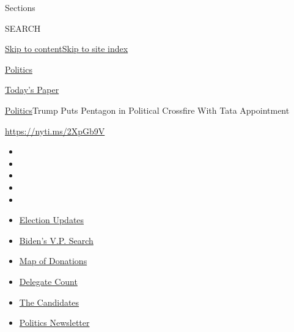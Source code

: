 Sections

SEARCH

\protect\hyperlink{site-content}{Skip to
content}\protect\hyperlink{site-index}{Skip to site index}

\href{https://www.nytimes3xbfgragh.onion/section/politics}{Politics}

\href{https://myaccount.nytimes3xbfgragh.onion/auth/login?response_type=cookie\&client_id=vi}{}

\href{https://www.nytimes3xbfgragh.onion/section/todayspaper}{Today's
Paper}

\href{/section/politics}{Politics}\textbar{}Trump Puts Pentagon in
Political Crossfire With Tata Appointment

\url{https://nyti.ms/2XpGb9V}

\begin{itemize}
\item
\item
\item
\item
\item
\end{itemize}

\begin{itemize}
\item
  \href{https://www.nytimes3xbfgragh.onion/2020/08/03/us/elections/biden-vs-trump.html?action=click\&pgtype=Article\&state=default\&region=TOP_BANNER\&context=storylines_menu}{Election
  Updates}
\item
  \href{https://www.nytimes3xbfgragh.onion/article/biden-vice-president-2020.html?action=click\&pgtype=Article\&state=default\&region=TOP_BANNER\&context=storylines_menu}{Biden's
  V.P. Search}
\item
  \href{https://www.nytimes3xbfgragh.onion/interactive/2020/07/24/us/politics/trump-biden-campaign-donors.html?action=click\&pgtype=Article\&state=default\&region=TOP_BANNER\&context=storylines_menu}{Map
  of Donations}
\item
  \href{https://www.nytimes3xbfgragh.onion/interactive/2020/us/elections/delegate-count-primary-results.html?action=click\&pgtype=Article\&state=default\&region=TOP_BANNER\&context=storylines_menu}{Delegate
  Count}
\item
  \href{https://www.nytimes3xbfgragh.onion/interactive/2019/us/politics/2020-presidential-candidates.html?action=click\&pgtype=Article\&state=default\&region=TOP_BANNER\&context=storylines_menu}{The
  Candidates}
\item
  \href{https://www.nytimes3xbfgragh.onion/newsletters/politics?action=click\&pgtype=Article\&state=default\&region=TOP_BANNER\&context=storylines_menu}{Politics
  Newsletter}
\end{itemize}

